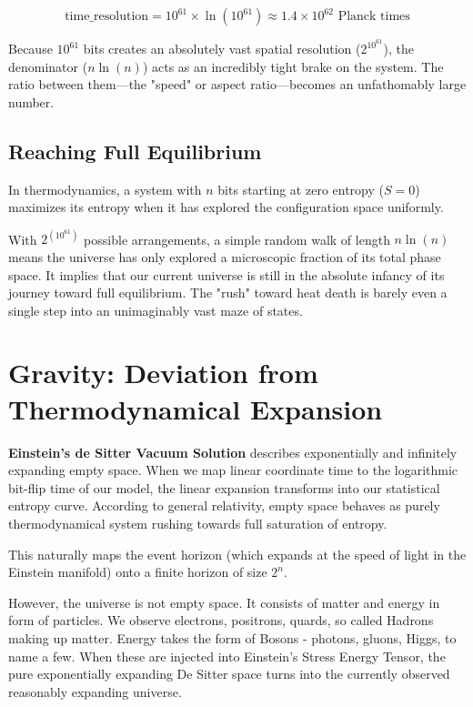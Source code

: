 \[
\text{time\_resolution} = 10^{61} \times \ln(10^{61}) \approx 1.4 \times 10^{62} \text{ Planck times}
\]

Because $10^{61}$ bits creates an absolutely vast spatial resolution ($2^{10^{61}}$), the
denominator ($n \ln(n)$) acts as an incredibly tight brake on the system.
The ratio between them—the "speed" or aspect ratio—becomes an unfathomably large number.

\subsection*{Reaching Full Equilibrium}

In thermodynamics, a system with $n$ bits starting at zero entropy ($S=0$)
maximizes its entropy when it has explored the configuration space uniformly.

With $2^{(10^{61})}$ possible arrangements, a simple random walk of length $n \ln(n)$ means the
universe has only explored a microscopic fraction of its total phase space.
It implies that our current universe is still in the absolute infancy of its journey toward full equilibrium.
The "rush" toward heat death is barely even a single step into an unimaginably vast maze of states.




\section*{Gravity: Deviation from Thermodynamical Expansion}

\textbf{Einstein's de Sitter Vacuum Solution} describes exponentially and
infinitely expanding empty space. When we map linear coordinate time to the logarithmic bit-flip time of our model, 
the linear expansion transforms into our statistical entropy curve. According to general
relativity, empty space behaves as purely thermodynamical system rushing towards full saturation of entropy.

This naturally maps the event horizon (which expands at the speed of light in the Einstein manifold) 
onto a finite horizon of size $2^n$.

However, the universe is not empty space. It consists of matter and energy in form of particles.
We observe electrons, positrons, quards, so called Hadrons making up matter. Energy takes the form
of Bosons - photons, gluons, Higgs, to name a few. When these are injected into Einstein's
Stress Energy Tensor, the pure exponentially expanding De Sitter space turns into the currently
observed reasonably expanding universe.

